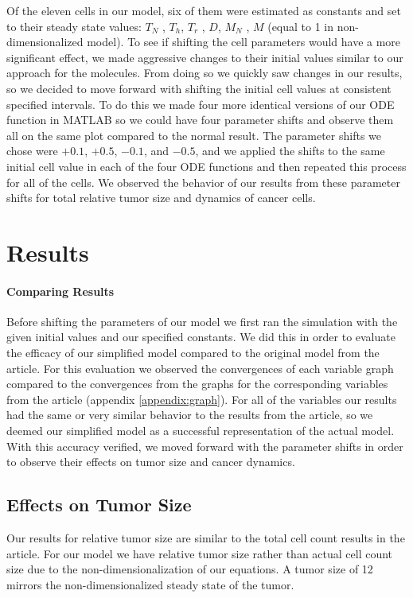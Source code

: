 \documentclass{article}
\begin{document}
Of the eleven cells in our model, six of them were estimated as constants and set to their steady state values: $T_N$ , $T_h$, $T_r$ , $D$, $M_N$ , $M$ (equal to 1 in non-dimensionalized model). To see if shifting the cell parameters would have a more significant effect, we made aggressive changes to their initial values similar to our approach for the molecules. From doing so we quickly saw changes in our results, so we decided to move forward with shifting the initial cell values at consistent specified intervals. To do this we made four more identical versions of our ODE function in MATLAB so we could have four parameter shifts and observe them all on the same plot compared to the normal result. The parameter shifts we chose were $+0.1$, $+0.5$, $-0.1$, and $-0.5$, and we applied the shifts to the same initial cell value in each of the four ODE functions and then repeated this process for all of the cells. We observed the behavior of our results from these parameter shifts for total relative tumor size and dynamics of cancer cells.

\section{Results}
\paragraph{Comparing Results}
Before shifting the parameters of our model we first ran the simulation with the given initial values and our specified constants. We did this in order to evaluate the efficacy of our simplified model compared to the original model from the article. For this evaluation we observed the convergences of each variable graph compared to the convergences from the graphs for the corresponding variables from the article (appendix \ref{appendix:graph}). For all of the variables our results had the same or very similar behavior to the results from the article, so we deemed our simplified model as a successful representation of the actual model. With this accuracy verified, we moved forward with the parameter shifts in order to observe their effects on tumor size and cancer dynamics. 
\subsection{Effects on Tumor Size}
Our results for relative tumor size are similar to the total cell count results in the article. For our model we have relative tumor size rather than actual cell count size due to the non-dimensionalization of our equations. A tumor size of 12 mirrors the non-dimensionalized steady state of the tumor. 
\end{document}
